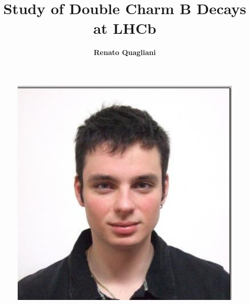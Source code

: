 \documentclass[11pt]{article}
\begin{document}
\vspace*{2cm}
\title{Study of Double Charm B Decays at LHCb}
\author{\Large\bf Renato Quagliani}

\address{Laboratoire de l'Accélérateur Linéaire (LAL), LHCb group,\\
 Orsay, France}

\begin{figure}
\begin{center}
\includegraphics[bb=-306 1136 675 -1000, scale=0.265]{figs/07b901e.eps}
\end{center}
\end{figure}
\end{document}
